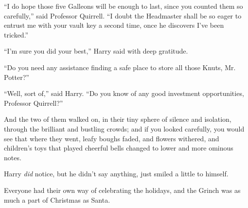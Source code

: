 ``I do hope those five Galleons will be enough to last, since you
counted them so carefully,'' said Professor Quirrell. ``I doubt the
Headmaster shall be so eager to entrust me with your vault key a second
time, once he discovers I've been tricked.''

``I'm sure you did your best,'' Harry said with deep gratitude.

``Do you need any assistance finding a safe place to store all those
Knuts, Mr. Potter?''

``Well, sort of,'' said Harry. ``Do you know of any good investment
opportunities, Professor Quirrell?''

And the two of them walked on, in their tiny sphere of silence and
isolation, through the brilliant and bustling crowds; and if you looked
carefully, you would see that where they went, leafy boughs faded, and
flowers withered, and children's toys that played cheerful bells changed
to lower and more ominous notes.

Harry \emph{did} notice, but he didn't say anything, just smiled a
little to himself.

Everyone had their own way of celebrating the holidays, and the Grinch
was as much a part of Christmas as Santa.
